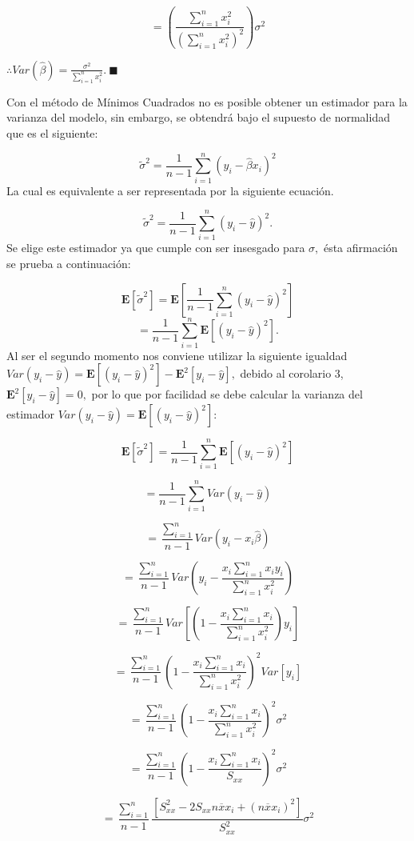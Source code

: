 \documentclass[
  a4paper,
  oneside,
  openany]{book}
\begin{document}
\[=\left(\frac{\sum_{i=1}^{n}x_{i}^2}{(\sum_{i=1}^{n}x_{i}^2)^2}\right)\sigma^2\]

\(\therefore Var\left( \hat{\beta}\right)=\frac{\sigma^2}{\sum_{i=1}^{n}x_{i}^2}. \ \blacksquare\)

Con el método de Mínimos Cuadrados no es posible obtener un estimador para la varianza del modelo, sin embargo, se obtendrá bajo el supuesto de normalidad que es el siguiente:

\[\tilde{\sigma}^2=\frac{1}{n-1}\sum_{i=1}^{n}\left(y_{i}-\hat{\beta}x_{i}\right)^2\]
La cual es equivalente a ser representada por la siguiente ecuación.

\[\tilde{\sigma}^2=\frac{1}{n-1}\sum_{i=1}^{n}(y_{i}-\hat{y})^2.\]
Se elige este estimador ya que cumple con ser insesgado para \(\sigma,\) ésta afirmación se prueba a continuación:

\[\mathbf{E}[\tilde{\sigma}^2]=\mathbf{E}\left[\frac{1}{n-1}\sum_{i=1}^{n}(y_{i}-\hat{y})^2\right]\]
\[=\frac{1}{n-1}\sum_{i=1}^{n}\mathbf{E}\left[(y_{i}-\hat{y})^2\right].\]
Al ser el segundo momento nos conviene utilizar la siguiente igualdad \(Var(y_{i}-\hat{y})=\mathbf{E}[(y_{i}-\hat{y})^2]-\mathbf{E}^2[y_{i}-\hat{y}],\) debido al corolario 3, \(\mathbf{E}^2[y_{i}-\hat{y}]=0,\) por lo que por facilidad se debe calcular la varianza del estimador \(Var(y_{i}-\hat{y})=\mathbf{E}[(y_{i}-\hat{y})^2]:\)

\[\mathbf{E}[\tilde{\sigma}^2]=\frac{1}{n-1}\sum_{i=1}^{n}\mathbf{E}\left[(y_{i}-\hat{y})^2\right]\]

\[=\frac{1}{n-1}\sum_{i=1}^{n}Var(y_{i}-\hat{y})\]

\[=\frac{\sum_{i=1}^{n}}{n-1}Var(y_{i}-x_{i}\hat{\beta})\]

\[=\frac{\sum_{i=1}^{n}}{n-1}Var\left(y_{i}-\frac{x_{i}\sum_{i=1}^{n}x_{i}y_{i}}{\sum_{i=1}^{n}x_{i}^2}\right)\]

\[=\frac{\sum_{i=1}^{n}}{n-1}Var\left[\left(1-\frac{x_{i}\sum_{i=1}^{n}x_{i}}{\sum_{i=1}^{n}x_{i}^2}\right)y_{i}\right]\]

\[=\frac{\sum_{i=1}^{n}}{n-1}\left(1-\frac{x_{i}\sum_{i=1}^{n}x_{i}}{\sum_{i=1}^{n}x_{i}^2}\right)^2Var[y_{i}]\]

\[=\frac{\sum_{i=1}^{n}}{n-1}\left(1-\frac{x_{i}\sum_{i=1}^{n}x_{i}}{\sum_{i=1}^{n}x_{i}^2}\right)^2\sigma^2\]

\[=\frac{\sum_{i=1}^{n}}{n-1}\left(1-\frac{x_{i}\sum_{i=1}^{n}x_{i}}{S_{xx}}\right)^2\sigma^2\]

\[=\frac{\sum_{i=1}^{n}}{n-1}\frac{[S_{xx}^2-2S_{xx}n\overline{x}x_{i}+(n\overline{x}x_{i})^2]}{S_{xx}^2}\sigma^2\]
\end{document}
